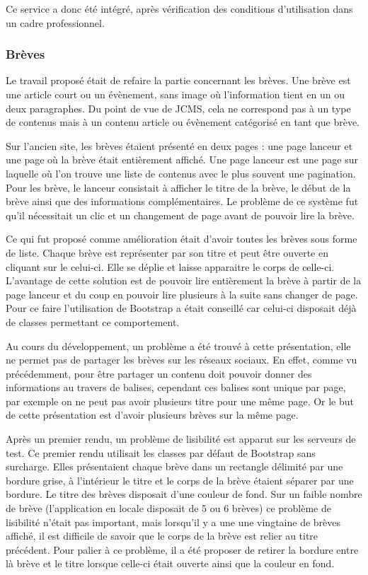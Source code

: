 \documentclass[12pt,a4paper]{article}
\begin{document}
Ce service a donc été intégré, après vérification des conditions d'utilisation dans un cadre professionnel.\par

\subsubsection{Brèves}
Le travail proposé était de refaire la partie concernant les brèves. Une brève est une article court ou un évènement, sans image où l'information tient en un ou deux paragraphes. Du point de vue de JCMS, cela ne correspond pas à un type de contenus mais à un contenu article ou évènement catégorisé en tant que brève.\par
\medskip
Sur l'ancien site, les brèves étaient présenté en deux pages : une page lanceur et une page où la brève était entièrement affiché. Une page lanceur est une page sur laquelle où l'on trouve une liste de contenus avec le plus souvent une pagination. Pour les brève, le lanceur consistait à afficher le titre de la brève, le début de la brève ainsi que des informations complémentaires. Le problème de ce système fut qu'il nécessitait un clic et un changement de page avant de pouvoir lire la brève.\par
Ce qui fut proposé comme amélioration était d'avoir toutes les brèves sous forme de liste. Chaque brève est représenter par son titre et peut être ouverte en cliquant sur le celui-ci. Elle se déplie et laisse apparaitre le corps de celle-ci. L'avantage de cette solution est de pouvoir lire entièrement la brève à partir de la page lanceur et du coup en pouvoir lire plusieurs à la suite sans changer de page. Pour ce faire l'utilisation de Bootstrap a était conseillé car celui-ci disposait déjà de classes permettant ce comportement.\par
\medskip
Au cours du développement, un problème a été trouvé à cette présentation, elle ne permet pas de partager les brèves sur les réseaux sociaux. En effet, comme vu précédemment, pour être partager un contenu doit pouvoir donner des informations au travers de balises, cependant ces balises sont unique par page, par exemple on ne peut pas avoir plusieurs titre pour une même page. Or le but de cette présentation est d'avoir plusieurs brèves sur la même page.\par
Après un premier rendu, un problème de lisibilité est apparut sur les serveurs de test. Ce premier rendu utilisait les classes par défaut de Bootstrap sans surcharge. Elles présentaient chaque brève dans un rectangle délimité par une bordure grise, à l'intérieur le titre et le corps de la brève étaient séparer par une bordure. Le titre des brèves disposait d'une couleur de fond. Sur un faible nombre de brève (l'application en locale disposait de 5 ou 6 brèves) ce problème de lisibilité n'était pas important, mais lorsqu'il y a une une vingtaine de brèves affiché, il est difficile de savoir que le corps de la brève est relier au titre précédent. Pour palier à ce problème, il a été proposer de retirer la bordure entre là brève et le titre lorsque celle-ci était ouverte ainsi que la couleur en fond.\par
\end{document}
